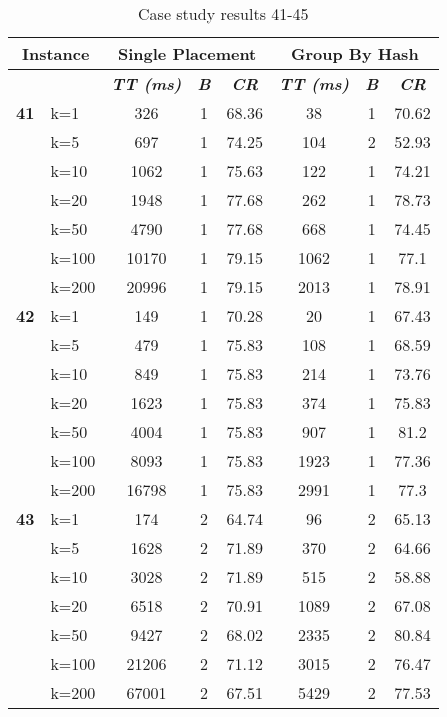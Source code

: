     \begin{table}[htbp]
    \caption{Case study results 41-45}
    \centering
    \begin{tabular}{|l|l|c|c|c|c|c|c|}
    \hline
    \multicolumn{ 2}{|c|}{\textbf{Instance}} & \multicolumn{ 3}{c|}{\textbf{Single Placement}} & \multicolumn{ 3}{c|}{\textbf{Group By Hash}} \\ \hline
    \multicolumn{ 2}{|l|}{} & \textbf{\textit{TT (ms)}} & \textbf{\textit{B}} & \textbf{\textit{CR}} & \textbf{\textit{TT (ms)}} & \textbf{\textit{B}} & \textbf{\textit{CR}} \\ \hline
    \multicolumn{1}{|r|}{\textbf{41}} & k=1 & 326 & 1 & 68.36 & 38 & 1 & 70.62 \\ 
     & k=5 & 697 & 1 & 74.25 & 104 & 2 & 52.93 \\ 
     & k=10 & 1062 & 1 & 75.63 & 122 & 1 & 74.21 \\ 
     & k=20 & 1948 & 1 & 77.68 & 262 & 1 & 78.73 \\ 
     & k=50 & 4790 & 1 & 77.68 & 668 & 1 & 74.45 \\ 
     & k=100 & 10170 & 1 & 79.15 & 1062 & 1 & 77.1 \\ 
     & k=200 & 20996 & 1 & 79.15 & 2013 & 1 & 78.91 \\ \hline
    \multicolumn{1}{|r|}{\textbf{42}} & k=1 & 149 & 1 & 70.28 & 20 & 1 & 67.43 \\ 
     & k=5 & 479 & 1 & 75.83 & 108 & 1 & 68.59 \\ 
     & k=10 & 849 & 1 & 75.83 & 214 & 1 & 73.76 \\ 
     & k=20 & 1623 & 1 & 75.83 & 374 & 1 & 75.83 \\ 
     & k=50 & 4004 & 1 & 75.83 & 907 & 1 & 81.2 \\ 
     & k=100 & 8093 & 1 & 75.83 & 1923 & 1 & 77.36 \\ 
     & k=200 & 16798 & 1 & 75.83 & 2991 & 1 & 77.3 \\ \hline
    \multicolumn{1}{|r|}{\textbf{43}} & k=1 & 174 & 2 & 64.74 & 96 & 2 & 65.13 \\ 
     & k=5 & 1628 & 2 & 71.89 & 370 & 2 & 64.66 \\ 
     & k=10 & 3028 & 2 & 71.89 & 515 & 2 & 58.88 \\ 
     & k=20 & 6518 & 2 & 70.91 & 1089 & 2 & 67.08 \\ 
     & k=50 & 9427 & 2 & 68.02 & 2335 & 2 & 80.84 \\ 
     & k=100 & 21206 & 2 & 71.12 & 3015 & 2 & 76.47 \\ 
     & k=200 & 67001 & 2 & 67.51 & 5429 & 2 & 77.53 \\ \hline

\end{tabular}
\end{table}
